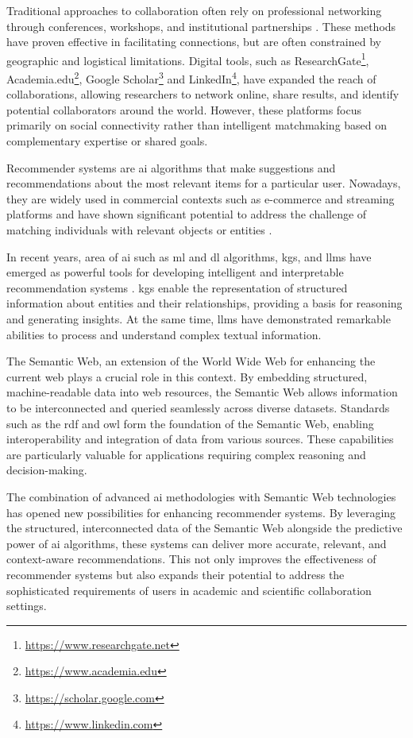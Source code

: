 Traditional approaches to collaboration often rely on professional networking through conferences, workshops, and institutional partnerships \cite{KATZ19971}.
These methods have proven effective in facilitating connections, but are often constrained by geographic and logistical limitations.
Digital tools, such as ResearchGate\footnote{\url{https://www.researchgate.net}}, Academia.edu\footnote{\url{https://www.academia.edu}}, Google Scholar\footnote{\url{https://scholar.google.com}} and LinkedIn\footnote{\url{https://www.linkedin.com}}, have expanded the reach of collaborations, allowing researchers to network online, share results, and identify potential collaborators around the world.
However, these platforms focus primarily on social connectivity rather than intelligent matchmaking based on complementary expertise or shared goals.

Recommender systems \cite{Lu2012} are \gls{ai} algorithms that make suggestions and recommendations about the most relevant items for a particular user.
Nowadays, they are widely used in commercial contexts such as e-commerce and streaming platforms and have shown significant potential to address the challenge of matching individuals with relevant objects or entities \cite{Hussien2021}.

In recent years, area of \gls{ai} such as \gls{ml} and \gls{dl} algorithms,  \glspl{kg}, and \glspl{llm} have emerged as powerful tools for developing intelligent and interpretable recommendation systems \cite{Zhao2024}.
\glspl{kg} enable the representation of structured information about entities and their relationships, providing a basis for reasoning and generating insights.
At the same time, \glspl{llm} have demonstrated remarkable abilities to process and understand complex textual information. 

The Semantic Web, an extension of the World Wide Web for enhancing the current web plays a crucial role in this context.
By embedding structured, machine-readable data into web resources, the Semantic Web allows information to be interconnected and queried seamlessly across diverse datasets.
Standards such as the \gls{rdf} \cite{Cyganiak14RCA} and \gls{owl} \cite{Deborah2004} form the foundation of the Semantic Web, enabling interoperability and integration of data from various sources.
These capabilities are particularly valuable for applications requiring complex reasoning and decision-making.

The combination of advanced \gls{ai} methodologies with Semantic Web technologies has opened new possibilities for enhancing recommender systems.
By leveraging the structured, interconnected data of the Semantic Web alongside the predictive power of \gls{ai} algorithms, these systems can deliver more accurate, relevant, and context-aware recommendations.
This not only improves the effectiveness of recommender systems but also expands their potential to address the sophisticated requirements of users in academic and scientific collaboration settings.
%
